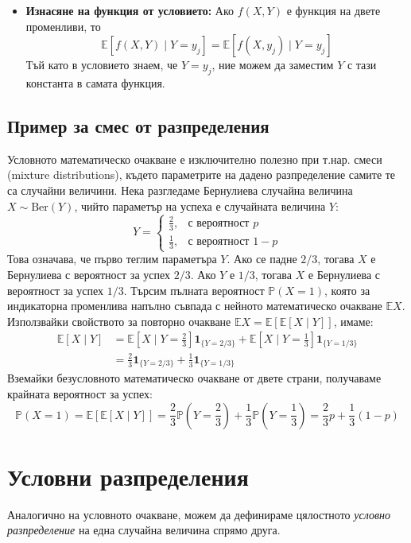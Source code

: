 \documentclass{article}
\begin{document}
\begin{itemize}
    \item \textbf{Изнасяне на функция от условието:} Ако $f(X,Y)$ е функция на двете променливи, то
    \[
    \mathbb{E}[f(X,Y) \mid Y=y_j] = \mathbb{E}[f(X, y_j) \mid Y=y_j]
    \]
    Тъй като в условието знаем, че $Y=y_j$, ние можем да заместим $Y$ с тази константа в самата функция.
\end{itemize}

\subsection{Пример за смес от разпределения}

Условното математическо очакване е изключително полезно при т.нар. смеси (mixture distributions), където параметрите на дадено разпределение самите те са случайни величини. Нека разгледаме Бернулиева случайна величина $X \sim \text{Ber}(Y)$, чийто параметър на успеха е случайната величина $Y$:
\[
Y = \begin{cases} 
\frac{2}{3}, & \text{с вероятност } p \\ 
\frac{1}{3}, & \text{с вероятност } 1-p 
\end{cases}
\]
Това означава, че първо теглим параметъра $Y$. Ако се падне $2/3$, тогава $X$ е Бернулиева с вероятност за успех $2/3$. Ако $Y$ е $1/3$, тогава $X$ е Бернулиева с вероятност за успех $1/3$. Търсим пълната вероятност $\mathbb{P}(X=1)$, която за индикаторна променлива напълно съвпада с нейното математическо очакване $\mathbb{E}X$. Използвайки свойството за повторно очакване $\mathbb{E}X = \mathbb{E}[\mathbb{E}[X \mid Y]]$, имаме:
\begin{align*}
\mathbb{E}[X \mid Y] &= \mathbb{E}\left[X \mid Y=\frac{2}{3}\right] \mathbf{1}_{\{Y=2/3\}} + \mathbb{E}\left[X \mid Y=\frac{1}{3}\right] \mathbf{1}_{\{Y=1/3\}} \\
&= \frac{2}{3} \mathbf{1}_{\{Y=2/3\}} + \frac{1}{3} \mathbf{1}_{\{Y=1/3\}}
\end{align*}
Вземайки безусловното математическо очакване от двете страни, получаваме крайната вероятност за успех:
\[
\mathbb{P}(X=1) = \mathbb{E}[\mathbb{E}[X \mid Y]] = \frac{2}{3} \mathbb{P}\left(Y=\frac{2}{3}\right) + \frac{1}{3} \mathbb{P}\left(Y=\frac{1}{3}\right) = \frac{2}{3}p + \frac{1}{3}(1-p)
\]

\section{Условни разпределения}

Аналогично на условното очакване, можем да дефинираме цялостното \emph{условно разпределение} на една случайна величина спрямо друга.
\end{document}
